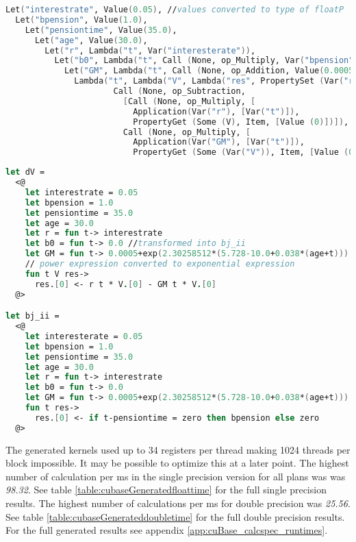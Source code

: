 \begin{lstlisting}[language=fsharp, caption=Quotation AST for dV method generated from CalcSpec AST, label=pe_quote]
Let("interestrate", Value(0.05), //values converted to type of floatP
  Let("bpension", Value(1.0), 
    Let("pensiontime", Value(35.0), 
      Let("age", Value(30.0), 
        Let("r", Lambda("t", Var("interesterate")), 
          Let("b0", Lambda("t", Call (None, op_Multiply, Var("bpension")::[Application(Var("delta"), Call (None, op_Subtraction, Var("t")::[Var("pensiontime")]))])), 
            Let("GM", Lambda("t", Call (None, op_Addition, Value(0.0005)::[...])), 
              Lambda("t", Lambda("V", Lambda("res", PropertySet (Var("res"), Item, [Value (0),
                      Call (None, op_Subtraction,
                        [Call (None, op_Multiply, [
                          Application(Var("r"), [Var("t")]),
                          PropertyGet (Some (V), Item, [Value (0)])]),
                        Call (None, op_Multiply, [
                          Application(Var("GM"), [Var("t")]),
                          PropertyGet (Some (Var("V")), Item, [Value (0)])])])]))))))))))))
\end{lstlisting}

\begin{lstlisting}[language=fsharp, caption=Formatted quotation AST for dV and bj\_ii methods, label=pe_quote_format]
let dV = 
  <@
    let interestrate = 0.05
    let bpension = 1.0
    let pensiontime = 35.0
    let age = 30.0
    let r = fun t-> interestrate
    let b0 = fun t-> 0.0 //transformed into bj_ii
    let GM = fun t-> 0.0005+exp(2.30258512*(5.728-10.0+0.038*(age+t))) 
    // power expression converted to exponential expression
    fun t V res->
      res.[0] <- r t * V.[0] - GM t * V.[0]
  @>

let bj_ii = 
  <@
    let interesterate = 0.05
    let bpension = 1.0
    let pensiontime = 35.0
    let age = 30.0
    let r = fun t-> interestrate
    let b0 = fun t-> 0.0
    let GM = fun t-> 0.0005+exp(2.30258512*(5.728-10.0+0.038*(age+t)))
    fun t res->
      res.[0] <- if t-pensiontime = zero then bpension else zero
  @>
\end{lstlisting}


The generated kernels used up to 34 registers per thread making 1024 threads per block impossible. 
It may be possible to optimize this at a later point.
The highest number of calculation per ms in the single precision version for all plans was was \emph{98.32}.
See table \ref{table:cubaseGeneratedfloattime} for the full single precision results. 
The highest number of calculations per ms for double precision was \emph{25.56}.
See table \ref{table:cubaseGenerateddoubletime} for the full double precision results. 
For the full generated results see appendix \ref{app:cuBase_calcspec_runtimes}.

